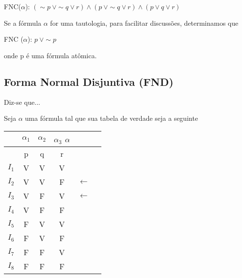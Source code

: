 \noindent FNC($\alpha$): $(\sim p\ \lor \sim q \lor r) \land (p\ \lor \sim q \lor r) \land (p \lor q \lor r)$

Se a fórmula $\alpha$ for uma tautologia, para facilitar discussões, determinamos que

\centerline{FNC ($\alpha$): $p\ \lor \sim p$}

onde p é uma fórmula atômica.

\pagebreak


\subsection{Forma Normal Disjuntiva (FND)}
\begin{defi}
    Diz-se que...
\end{defi}



\begin{exemplo}
    Seja $\alpha$ uma fórmula tal que sua tabela de verdade seja a seguinte
\end{exemplo}

\begin{tabular}{c | c c c c l}
    & $\alpha_1$ & $\alpha_2$ & $\alpha_3$ $\alpha$ & \\ \hline
    & p & q & r & & \\
    $I_1$ & V & V & V & \\
    $I_2$ & V & V & F & $\longleftarrow$ \\
    $I_3$ & V & F & V & $\longleftarrow$ \\
    $I_4$ & V & F & F & \\
    $I_5$ & F & V & V & \\
    $I_6$ & F & V & F & \\
    $I_7$ & F & F & V & \\
    $I_8$ & F & F & F & \\
\end{tabular}
